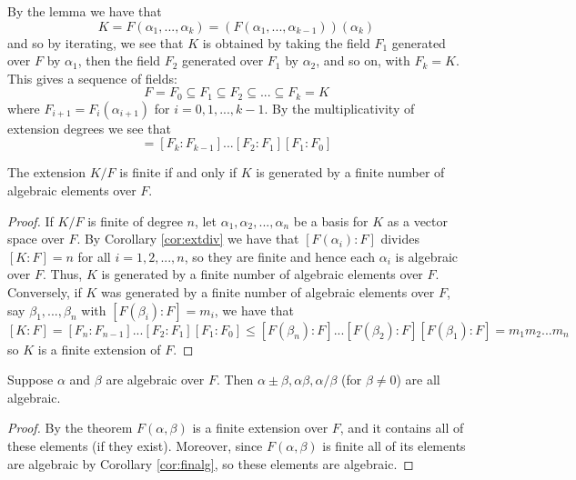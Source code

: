 \documentclass[12pt, a4paper, oneside, openright, titlepage]{book}
\begin{document}
By the lemma we have that \begin{equation*}
    K = F(\alpha_1,...,\alpha_k) = (F(\alpha_1,...,\alpha_{k-1}))(\alpha_k)
\end{equation*}
and so by iterating, we see that $K$ is obtained by taking the field $F_1$ generated over $F$ by $\alpha_1$, then the field $F_2$ generated over $F_1$ by $\alpha_2$, and so on, with $F_k = K$. This gives a sequence of fields: \begin{equation*}
    F = F_0 \subseteq F_1 \subseteq F_2 \subseteq ...\subseteq F_k = K
\end{equation*}
where $F_{i+1} = F_i(\alpha_{i+1})$ for $i = 0,1,...,k-1$. By the multiplicativity of extension degrees we see that \begin{equation*}
    [K:F] = [F_k:F_{k-1}]...[F_2:F_1][F_1:F_0]
\end{equation*}


\begin{thm}\label{thm:finalgext}
    The extension $K/F$ is finite if and only if $K$ is generated by a finite number of algebraic elements over $F$.
\end{thm}
\begin{proof}
    If $K/F$ is finite of degree $n$, let $\alpha_1,\alpha_2,...,\alpha_n$ be a basis for $K$ as a vector space over $F$. By Corollary \ref{cor:extdiv} we have that $[F(\alpha_i):F]$ divides $[K:F] = n$ for all $i = 1,2,...,n$, so they are finite and hence each $\alpha_i$ is algebraic over $F$. Thus, $K$ is generated by a finite number of algebraic elements over $F$. Conversely, if $K$ was generated by a finite number of algebraic elements over $F$, say $\beta_1,...,\beta_n$ with $[F(\beta_i):F] = m_i$, we have that $$[K:F] = [F_n:F_{n-1}]...[F_2:F_1][F_1:F_0] \leq [F(\beta_n):F]...[F(\beta_2):F][F(\beta_1):F] = m_1m_2...m_n$$ so $K$ is a finite extension of $F$.
\end{proof}


\begin{cor}
    Suppose $\alpha$ and $\beta$ are algebraic over $F$. Then $\alpha\pm\beta,\alpha\beta,\alpha/\beta$ (for $\beta\neq 0$) are all algebraic.
\end{cor}
\begin{proof}
    By the theorem $F(\alpha,\beta)$ is a finite extension over $F$, and it contains all of these elements (if they exist). Moreover, since $F(\alpha,\beta)$ is finite all of its elements are algebraic by Corollary \ref{cor:finalg}, so these elements are algebraic.
\end{proof}
\end{document}
